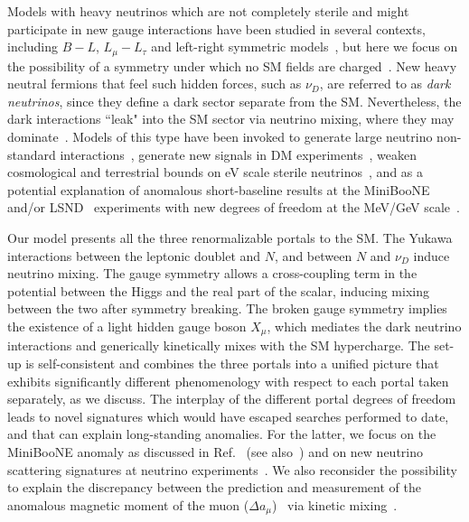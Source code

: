 Models with heavy neutrinos which are not completely sterile and might participate in new gauge interactions have been studied in several contexts, including $B-L$, $L_\mu-L_\tau$ and left-right symmetric models~\cite{%
Buchmuller:1991ce,%
Khalil:2006yi,%
Perez:2009mu,%
Khalil:2010iu,%
Dib:2014fua,%
Baek:2015mna,%
DeRomeri:2017oxa,%
Nomura:2018mwr,%
Brdar:2018sbk%
}, but here we focus on the possibility of a symmetry under which no SM fields are charged~\cite{%
Okada:2014nsa,%
Diaz:2017edh,%
Nomura:2018ibs%
}. New heavy neutral fermions that feel such hidden forces, such as $\nu_D$, are referred to as \textit{dark neutrinos}, since they define a dark sector separate from the SM. Nevertheless, the dark interactions ``leak" into the SM sector via neutrino mixing, where they may dominate~\cite{Pospelov:2011ha,Batell:2016zod}. Models of this type have been invoked to generate large neutrino non-standard interactions~\cite{Farzan:2015doa,Farzan:2016wym}, generate new signals in DM experiments~\cite{Pospelov:2011ha,Pospelov:2012gm,Pospelov:2013rha,Harnik:2012ni,McKeen:2018pbb}, weaken cosmological and terrestrial bounds on eV scale sterile neutrinos~\cite{Hannestad:2013ana,Dasgupta:2013zpn,Mirizzi:2014ama,Chu:2015ipa,Cherry:2016jol,Chu:2018gxk,Denton:2018dqq,Esmaili:2018qzu}, and as a potential explanation of anomalous short-baseline results at the MiniBooNE~\cite{AguilarArevalo:2007it,Aguilar-Arevalo:2018gpe} and/or LSND~\cite{PhysRevLett.77.3082,Aguilar:2001ty} experiments with new degrees of freedom at the MeV/GeV scale~\cite{Gninenko:2009ks,Gninenko:2010pr,Masip:2012ke,Radionov:2013mca,Ballett:2018ynz,Bertuzzo:2018itn,Arguelles:2018mtc}.

Our model presents all the three renormalizable portals to the SM. The Yukawa interactions between the leptonic doublet and $N$, and between $N$ and $\nu_D$ induce neutrino mixing. 
The gauge symmetry allows a cross-coupling term in the potential between the Higgs and the real part of the scalar, inducing mixing between the two after symmetry breaking. The broken gauge symmetry implies the existence of a light hidden gauge boson $X_\mu$, which mediates the dark neutrino interactions and generically kinetically mixes with the SM hypercharge. The set-up is self-consistent and combines the three portals into a unified picture that exhibits significantly different phenomenology with respect to each portal taken separately, as we discuss. The interplay of the different portal degrees of freedom leads to novel signatures which would have escaped searches performed to date, and that can explain long-standing anomalies. For the latter, we focus on the MiniBooNE anomaly as discussed in Ref.~\cite{Ballett:2018ynz} (see also~\cite{Bertuzzo:2018itn}) and on new neutrino scattering signatures at neutrino experiments~\cite{Arguelles:2018mtc}. We also reconsider the possibility to explain the discrepancy between the prediction and measurement of the anomalous magnetic moment of the muon ($\Delta a_\mu$)~\cite{Bennett:2006fi} via kinetic mixing~\cite{Fayet:2007ua,Pospelov:2008zw}.

